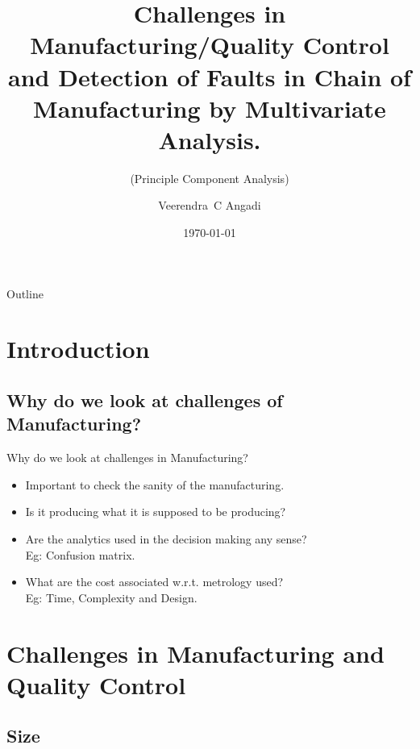 \documentclass{beamer}
\title[Challenges in Mnfg/QC and Faults Detection using PCA]{Challenges in Manufacturing/Quality Control and Detection of Faults in Chain of Manufacturing by Multivariate Analysis.}
\subtitle{(Principle Component Analysis)}
\author{Veerendra~C Angadi}
\institute[University of Sheffield] %
{
  Department of Electronic and Electrical Engineering,\\
  George Porter Building, Red Hill - Broad Lane,\\
  University of Sheffield - S3 7HQ
}
\date{\today}
\begin{document}
\begin{frame}
  \titlepage
\end{frame}

\begin{frame}{Outline}
  \tableofcontents
\end{frame}

\section{Introduction}

\subsection{Why do we look at challenges of Manufacturing?}


\begin{frame}{Why do we look at challenges in Manufacturing?}
  \begin{itemize}
    \item Important to check the sanity of the manufacturing.
    \item Is it producing what it is supposed to be producing?
    \item Are the analytics used in the decision making any sense? \\ Eg: Confusion matrix.
    \item What are the cost associated w.r.t. metrology used? \\ Eg: Time, Complexity and Design.
  \end{itemize}
\end{frame}

\section{Challenges in Manufacturing and Quality Control}

\subsection{Size}
\end{document}

